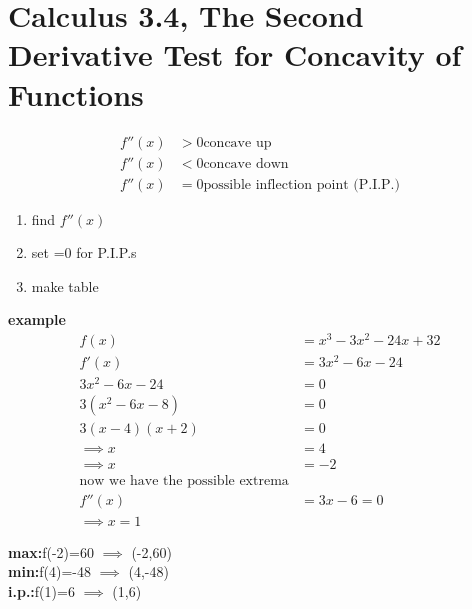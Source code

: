\documentclass{report}
\begin{document}
\section{Calculus 3.4, The Second Derivative Test for Concavity of Functions}
\begin{multicols}{2}

\begin{tcolorbox}[colback=blue!10!white,colframe=blue!50!black,title=Recall:]
  \begin{align*}
    f''(x) &> 0 \text{concave up}\\
    f''(x) &< 0 \text{concave down}\\
    f''(x) &= 0 \text{possible inflection point (P.I.P.)}
  \end{align*}
\end{tcolorbox}

\begin{center}

\end{center}



\begin{tcolorbox}[colback=red!10!white,colframe=red!50!black,title=How to find Inflection Points with the 2nd Derivative Test]
\begin{enumerate}
  \item find $f''(x)$
  \item set =0 for P.I.P.s
  \item make table
\end{enumerate}
\end{tcolorbox}

\textbf{example}
\begin{align*}
 f(x)&=x^3-3x^2-24x+32\\ 
 f'(x)&=3x^2-6x-24\\
3x^2-6x-24&=0\\
3(x^2-6x-8)&=0\\
3(x-4)(x+2)&=0\\
\implies x&=4\\
\implies x&=-2\\
\text{now we have the possible extrema}\\
f''(x)&=3x-6=0\\
\implies x=1
\end{align*}
 
\begin{center}

\end{center}


\begin{tcolorbox}[colback=green!10!white,colframe=green!50!black,title=Solution]
\textbf{max:}f(-2)=60 $\implies$ (-2,60) \\
\textbf{min:}f(4)=-48 $\implies$ (4,-48) \\
\textbf{i.p.:}f(1)=6 $\implies$ (1,6)
\end{tcolorbox}

\end{multicols}
\end{document}
